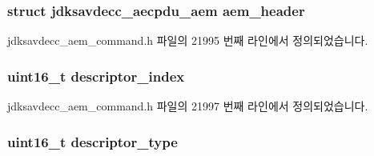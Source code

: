 \subsubsection[{\texorpdfstring{aem\+\_\+header}{aem_header}}]{\setlength{\rightskip}{0pt plus 5cm}struct {\bf jdksavdecc\+\_\+aecpdu\+\_\+aem} aem\+\_\+header}\hypertarget{structjdksavdecc__aem__command__set__matrix__response_ae1e77ccb75ff5021ad923221eab38294}{}\label{structjdksavdecc__aem__command__set__matrix__response_ae1e77ccb75ff5021ad923221eab38294}


jdksavdecc\+\_\+aem\+\_\+command.\+h 파일의 21995 번째 라인에서 정의되었습니다.

\subsubsection[{\texorpdfstring{descriptor\+\_\+index}{descriptor_index}}]{\setlength{\rightskip}{0pt plus 5cm}uint16\+\_\+t descriptor\+\_\+index}\hypertarget{structjdksavdecc__aem__command__set__matrix__response_a042bbc76d835b82d27c1932431ee38d4}{}\label{structjdksavdecc__aem__command__set__matrix__response_a042bbc76d835b82d27c1932431ee38d4}


jdksavdecc\+\_\+aem\+\_\+command.\+h 파일의 21997 번째 라인에서 정의되었습니다.

\subsubsection[{\texorpdfstring{descriptor\+\_\+type}{descriptor_type}}]{\setlength{\rightskip}{0pt plus 5cm}uint16\+\_\+t descriptor\+\_\+type}\hypertarget{structjdksavdecc__aem__command__set__matrix__response_ab7c32b6c7131c13d4ea3b7ee2f09b78d}{}\label{structjdksavdecc__aem__command__set__matrix__response_ab7c32b6c7131c13d4ea3b7ee2f09b78d}


